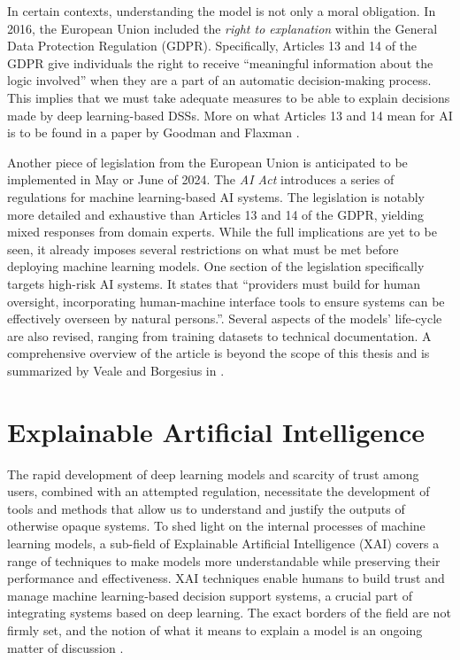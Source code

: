In certain contexts, understanding the model is not only a moral obligation.
In 2016, the European Union included the \emph{right to explanation} within the General Data Protection Regulation (GDPR).
Specifically, Articles 13 and 14 of the GDPR give individuals the right to receive ``meaningful information about the logic involved'' when they are a part of an automatic decision-making process.
This implies that we must take adequate measures to be able to explain decisions made by deep learning-based DSSs.
More on what Articles 13 and 14 mean for AI is to be found in a paper by Goodman and Flaxman \cite{xai-gdpr}.

Another piece of legislation from the European Union is anticipated to be implemented in May or June of 2024.
The \emph{AI Act} introduces a series of regulations for machine learning-based AI systems.
The legislation is notably more detailed and exhaustive than Articles 13 and 14 of the GDPR, yielding mixed responses from domain experts.
While the full implications are yet to be seen, it already imposes several restrictions on what must be met before deploying machine learning models.
One section of the legislation specifically targets high-risk AI systems.
It states that ``providers must build for human oversight, incorporating human-machine interface tools to ensure systems can be effectively overseen by natural persons.''.
Several aspects of the models' life-cycle are also revised, ranging from training datasets to technical documentation.
A comprehensive overview of the article is beyond the scope of this thesis and is summarized by Veale and Borgesius in \cite{xai-ai-act}.

\section{Explainable Artificial Intelligence}

The rapid development of deep learning models and scarcity of trust among users, combined with an attempted regulation, necessitate the development of tools and methods that allow us to understand and justify the outputs of otherwise opaque systems.
To shed light on the internal processes of machine learning models, a sub-field of Explainable Artificial Intelligence (XAI) covers a range of techniques to make models more understandable while preserving their performance and effectiveness.
XAI techniques enable humans to build trust and manage machine learning-based decision support systems, a crucial part of integrating systems based on deep learning.
The exact borders of the field are not firmly set, and the notion of what it means to explain a model is an ongoing matter of discussion \cite{xai-survey}.

